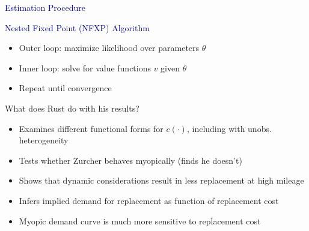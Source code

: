 \documentclass[aspectratio=169]{beamer}
\begin{document}
\begin{frame}

\textcolor{navy}{Estimation Procedure}

\bigskip{}


\bigskip{}



\end{frame}

\begin{frame}

\textcolor{navy}{Nested Fixed Point (NFXP) Algorithm}

\bigskip{}

\begin{itemize}
\itemsep1.5em
\item Outer loop: maximize likelihood over parameters $\theta$
\item Inner loop: solve for value functions $v$ given $\theta$
\item Repeat until convergence
\end{itemize}

\bigskip{}



\end{frame}


\begin{frame}
What does Rust do with his results?
\bigskip{}

\begin{itemize}
\itemsep1.5em
    \item<1-> Examines different functional forms for $c(\cdot)$, including with unobs. heterogeneity
    \item<2-> Tests whether Zurcher behaves myopically (finds he doesn't)
    \item<3-> Shows that dynamic considerations result in less replacement at high mileage
    \item<4-> Infers implied demand for replacement as function of replacement cost
    \item<5-> Myopic demand curve is much more sensitive to replacement cost 
\end{itemize}
\end{frame}
\end{document}
